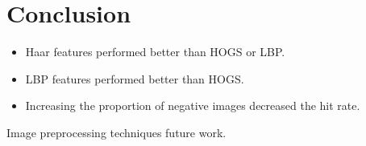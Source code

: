 \documentclass{llncs}
\begin{document}
	\section{Conclusion} {
	\label{sec:conclusion}
			
		\begin{itemize}
			\item Haar features performed better than HOGS or LBP.
			\item LBP features performed better than HOGS.
			\item Increasing the proportion of negative images decreased the hit rate.
		\end{itemize}

		Image preprocessing techniques future work.

	}

	
	
\end{document}
